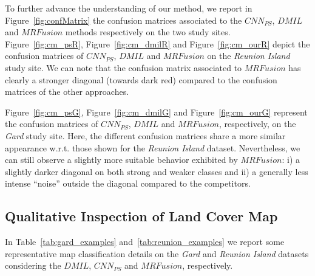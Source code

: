 \documentclass[journal]{IEEEtran}
\newcommand{\method}{$MRFusion$}
\begin{document}
\begin{figure*}[!ht]
\centering
{}
\newline
{}
\caption{Confusion matrices of the Deep Learning approaches on the \textit{Reunion Island} dataset ( $CNN_{PS}$ (a),  $DMIL$ (b) and \method{} (c) ) and on the \textit{Gard} dataset ( $CNN_{PS}$ (d), $DMIL$ (e) and \method{} (f) ).}
\label{fig:confMatrix}
\end{figure*}To further advance the understanding of our method, we report in Figure~\ref{fig:confMatrix} the confusion matrices associated to the $CNN_{PS}$, $DMIL$ and \method{} methods respectively on the two study sites.
Figure~\ref{fig:cm_psR}, Figure~\ref{fig:cm_dmilR} and Figure~\ref{fig:cm_ourR} depict the confusion matrices of $CNN_{PS}$, $DMIL$ and \method{} on the \textit{Reunion Island} study site. We can note that the confusion matrix associated to \method{} has clearly a stronger diagonal (towards dark red) compared to the confusion matrices of the other approaches. %

Figure~\ref{fig:cm_psG}, Figure~\ref{fig:cm_dmilG} and Figure~\ref{fig:cm_ourG} represent the confusion matrices of $CNN_{PS}$, $DMIL$ and \method{}, respectively, on the \textit{Gard} study site. Here, the different confusion matrices share a more similar appearance w.r.t. those shown for the \textit{Reunion Island} dataset. Nevertheless, we can still observe a slightly more suitable behavior exhibited by \method: i) a slightly darker diagonal on both strong and weaker classes and ii) a generally less intense ``noise'' outside the diagonal compared to the competitors.

\subsection{Qualitative Inspection of Land Cover Map}
In Table~\ref{tab:gard_examples} and~\ref{tab:reunion_examples} we report some representative map classification details on the \textit{Gard} and \textit{Reunion Island} datasets considering the $DMIL$, $CNN_{PS}$ and \method, respectively.
\end{document}
